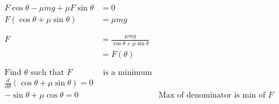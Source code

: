 \documentclass[12pt]{article}
\begin{document}
\begin{align*}
	F \cos{\theta} - \mu mg + \mu F \sin{\theta}       & = 0                                                                                                                          \\
	F(\cos{\theta} + \mu \sin{\theta})                 & = \mu mg                                                                                                                     \\
	\phantom{=}                                                                                                                                                                       \\
	F                                                  & = \frac{\mu mg}{\cos{\theta} + \mu \sin{\theta}}                                                                             \\
	                                                   & = F(\theta)                                                                                                                  \\
	\phantom{=}                                                                                                                                                                       \\
	\text{Find } \theta \text{ such that } F           & \text{ is a minimum}                                                                                                         \\
	\frac{d}{d \theta} (\cos{\theta} + \mu \sin{\theta}) = 0                                                                                                                          \\
	-\sin{\theta} + \mu \cos{\theta} = 0               &                                                  & \text{Max of denominator is min of } F                                    \\
	\phantom{=}                                                                                                                                                                       \\
\end{align*}
\end{document}
